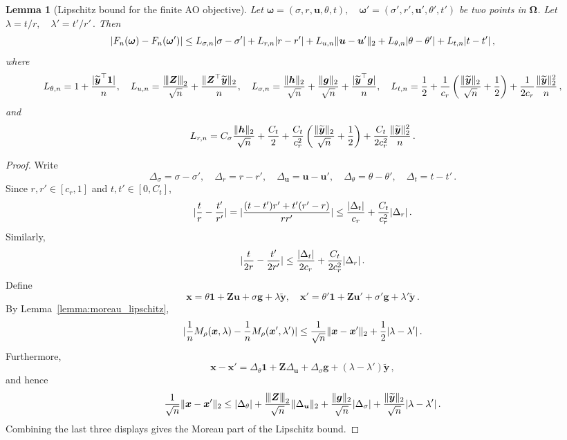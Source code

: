 \documentclass{article}
\makeatletter
\newtheorem{lemma}{Lemma}
\theoremstyle{definition}
\newcommand{\vnorm}[1]{%
	\ensuremath{%
		\if@display
		\left\| #1 \right\|
		\else
		\| #1 \|
		\fi
	}%
}
\newcommand{\abs}[1]{%
	\ensuremath{%
		\if@display
		\left| #1 \right|
		\else
		\lvert #1 \rvert
		\fi
	}%
}
\newcommand{\mnorm}[1]{{\left\vert\kern-0.25ex\left\vert\kern-0.25ex\left\vert #1
		\right\vert\kern-0.25ex\right\vert\kern-0.25ex\right\vert}}
\newcommand*{\bb}{\boldsymbol}
\def\bu{\bb{u}}
\def\bh{\bb{h}}
\def\bg{\bb{g}}
\def\bYtil{\widetilde{\bb{y}}}
\makeatother
\begin{document}
\begin{bibunit}
	\begin{lemma}[Lipschitz bound for the finite AO objective]
		\label{lemma:lipschitz_ao}
		Let $\bb\omega=(\sigma,r,\bu,\theta,t), \quad \bb\omega'=(\sigma',r',\bu',\theta',t')$
		be two points in $\bb\Omega$. Let $\lambda=t/r, \quad \lambda'=t'/r'\,.$
	Then
	$$
		\abs{F_n(\bb\omega)-F_n(\bb\omega')}
		\leq
		L_{\sigma,n}\abs{\sigma-\sigma'}
		+
		L_{r,n}\abs{r-r'}
		+
		L_{u,n}\vnorm{\bu-\bu'}_2
		+
		L_{\theta,n}\abs{\theta-\theta'}
		+
		L_{t,n}\abs{t-t'}\,,
	$$
	where
	$$
		L_{\theta,n}
		=
		1+\frac{\abs{\bYtil^\top\bb1}}{n}, \quad 
		L_{u,n}
		=
		\frac{\mnorm{\bb Z}_2}{\sqrt n}
		+
		\frac{\vnorm{\bb Z^\top\bYtil}_2}{n}, \quad 
		L_{\sigma,n}
		=
		\frac{\vnorm{\bh}_2}{\sqrt n}
		+
		\frac{\vnorm{\bg}_2}{\sqrt n}
		+
		\frac{\abs{\bYtil^\top\bg}}{n}, \quad 
		L_{t,n}
		=
		\frac12
		+
		\frac1{c_r}
		\left(
			\frac{\vnorm{\bYtil}_2}{\sqrt n}
			+
			\frac12
		\right)
		+
		\frac1{2c_r}
		\frac{\vnorm{\bYtil}_2^2}{n}\,,
	$$
	and
	$$
		L_{r,n}
		=
		C_\sigma\frac{\vnorm{\bh}_2}{\sqrt n}
		+
		\frac{C_t}{2}
		+
		\frac{C_t}{c_r^2}
		\left(
			\frac{\vnorm{\bYtil}_2}{\sqrt n}
			+
			\frac12
		\right)
		+
		\frac{C_t}{2c_r^2}
		\frac{\vnorm{\bYtil}_2^2}{n}\,.
	$$
\end{lemma}
\begin{proof}
	Write
	$$
		\Delta_\sigma=\sigma-\sigma',
		\quad
		\Delta_r=r-r',
		\quad
		\Delta_{\bu}=\bu-\bu',
		\quad
		\Delta_\theta=\theta-\theta',
		\quad
		\Delta_t=t-t'\,.
	$$
	Since $r,r'\in[c_r,1]$ and $t,t'\in[0,C_t]$,
	$$
		\abs{
			\frac tr-\frac{t'}{r'}
		}
		=
		\abs{
			\frac{(t-t')r'+t'(r'-r)}{rr'}
		}
		\leq
		\frac{\abs{\Delta_t}}{c_r}
		+
		\frac{C_t}{c_r^2}\abs{\Delta_r}\,.
	$$
	Similarly,
	$$
		\abs{
			\frac{t}{2r}
			-
			\frac{t'}{2r'}
		}
		\leq
		\frac{\abs{\Delta_t}}{2c_r}
		+
		\frac{C_t}{2c_r^2}\abs{\Delta_r}\,.
	$$
	Define
	$$
		\bb x
		=
		\theta\bb1+\bb Z\bu+\sigma\bg+\lambda\bYtil,
		\quad
		\bb x'
		=
		\theta'\bb1+\bb Z\bu'+\sigma'\bg+\lambda'\bYtil\,.
	$$
	By Lemma~\ref{lemma:moreau_lipschitz},
	$$
		\abs{
			\frac1nM_\rho(\bb x,\lambda)
			-
			\frac1nM_\rho(\bb x',\lambda')
		}
		\leq
		\frac1{\sqrt n}\vnorm{\bb x-\bb x'}_2
		+
		\frac12\abs{\lambda-\lambda'}\,.
	$$
	Furthermore,
	$$
		\bb x-\bb x'
		=
		\Delta_\theta\bb1
		+
		\bb Z\Delta_{\bu}
		+
		\Delta_\sigma\bg
		+
		(\lambda-\lambda')\bYtil\,,
	$$
	and hence
	$$
		\frac1{\sqrt n}\vnorm{\bb x-\bb x'}_2
		\leq
		\abs{\Delta_\theta}
		+
		\frac{\mnorm{\bb Z}_2}{\sqrt n}\vnorm{\Delta_{\bu}}_2
		+
		\frac{\vnorm{\bg}_2}{\sqrt n}\abs{\Delta_\sigma}
		+
		\frac{\vnorm{\bYtil}_2}{\sqrt n}\abs{\lambda-\lambda'}\,.
	$$
	Combining the last three displays gives the Moreau part of the Lipschitz bound.


\end{proof}
\end{bibunit}
\end{document}
